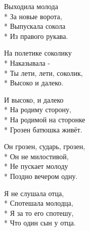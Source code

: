 \medskip

\begin{minipage}{\linewidth}
Выходила молода\\*
За новые ворота,\\*
Выпускала сокола\\*
Из правого рукава.\\
\end{minipage}\par\medskip\nobreak

\medskip

\begin{minipage}{\linewidth}
На полетике соколику\\*
Наказывала -\\*
Ты лети, лети, соколик,\\*
Высоко и далеко.\\
\end{minipage}\par\medskip\nobreak

\medskip

\begin{minipage}{\linewidth}
И высоко, и далеко\\*
На родиму сторону,\\*
На родимой на сторонке\\*
Грозен батюшка живёт.\\
\end{minipage}\par\medskip\nobreak

\medskip

\begin{minipage}{\linewidth}
Он грозен, сударь, грозен,\\*
Он не милостивой,\\*
Не пускает молоду\\*
Поздно вечером одну.\\
\end{minipage}\par\medskip\nobreak

\medskip

\begin{minipage}{\linewidth}
Я не слушала отца,\\*
Спотешала молодца,\\*
Я за то его спотешу,\\*
Что один сын у отца.\\
\end{minipage}\par\medskip\nobreak

